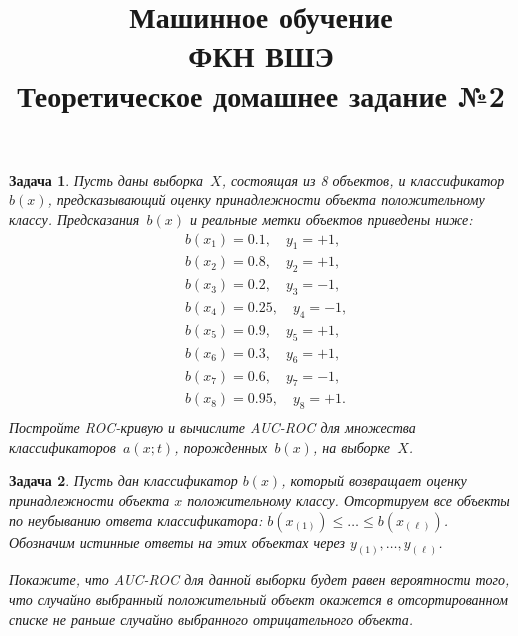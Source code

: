 \documentclass[12pt,fleqn]{article}
\newtheorem{esProblem}{Задача}
\begin{document}
\title{Машинное обучение\\ФКН ВШЭ\\Теоретическое домашнее задание №2}

\date{}

\author{}

\maketitle


\begin{esProblem}
		Пусть даны выборка~$X$, состоящая из 8 объектов, и классификатор~$b(x)$, предсказывающий оценку принадлежности объекта положительному классу. Предсказания~$b(x)$ и реальные метки объектов приведены ниже:
		\begin{align*}
			&b(x_1) = 0.1, \quad  y_1 = +1,\\
			&b(x_2) = 0.8, \quad y_2 = +1,\\
			&b(x_3) = 0.2, \quad y_3 = -1,\\
			&b(x_4) = 0.25, \quad y_4 = -1,\\
			&b(x_5) = 0.9, \quad y_5 = +1,\\
			&b(x_6) = 0.3, \quad y_6 = +1,\\
			&b(x_7) = 0.6, \quad y_7 = -1,\\
			&b(x_8) = 0.95, \quad y_8 = +1.\\
		\end{align*}
    Постройте ROC-кривую и вычислите AUC-ROC для множества классификаторов~$a(x;t)$, порожденных~$b(x)$, на выборке~$X$.

\end{esProblem}

\begin{esProblem}
	Пусть дан  классификатор $b(x)$, который возвращает оценку принадлежности объекта $x$ положительному классу. Отсортируем все объекты по неубыванию ответа классификатора: $b(x_{(1)}) \le \dots \le b(x_{(\ell)})$. Обозначим истинные ответы на этих объектах через $y_{(1)}, \dots, y_{(\ell)}$.
	
	Покажите, что AUC-ROC для данной выборки будет равен вероятности того, что случайно выбранный положительный объект окажется в отсортированном списке не раньше случайно выбранного отрицательного объекта.

\end{esProblem}
\end{document}

